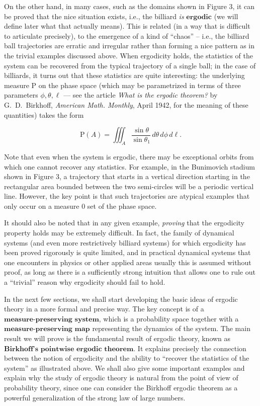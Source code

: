 \documentclass[11pt]{report}
\theoremstyle{plain}
\theoremstyle{definition}
\begin{document}
On the other hand, in many cases, such as the domains shown in Figure 3, it can be proved that the nice situation exists, i.e., the billiard \emph{is} $\textbf{ergodic}$ (we will define later what that actually means). This is related (in a way that is difficult to articulate precisely), to the emergence of a kind of ``chaos'' -- i.e., the billiard ball trajectories are erratic and irregular rather than forming a nice pattern as in the trivial examples discussed above. When ergodicity holds, the statistics of the system can be recovered from the typical trajectory of a single ball; in the case of billiards, it turns out that these statistics are quite interesting: the underlying measure $\mathrm{P}$ on the phase space (which may be parametrized in terms of three parameters $\phi, \theta, \ell$ --- see the article \emph{What is the ergodic theorem?} by G.~D.~Birkhoff, \emph{American Math. Monthly}, April 1942, for the meaning of these quantities) takes the form

\[
\mathrm{P}(A) = \iiint_A \frac{\sin \theta}{\sin\theta_1} \,d\theta\,d\phi\,d\ell.
\]

Note that even when the system is ergodic, there may be exceptional orbits from which one cannot recover any statistics. For example, in the Bunimovich stadium shown in Figure 3, a trajectory that starts in a vertical direction starting in the rectangular area bounded between the two semi-circles will be a periodic vertical line. However, the key point is that such trajectories are atypical examples that only occur on a measure 0 set of the phase space.

It should also be noted that in any given example, \emph{proving} that the ergodicity property holds may be extremely difficult. In fact, the family of dynamical systems (and even more restrictively billiard systems) for which ergodicity has been proved rigorously is quite limited, and in practical dynamical systems that one encounters in physics or other applied areas usually this is assumed without proof, as long as there is a sufficiently strong intuition that allows one to rule out a ``trivial'' reason why ergodicity should fail to hold.

In the next few sections, we shall start developing the basic ideas of ergodic theory in a more formal and precise way. The key concept is of a $\textbf{measure-preserving system}$, which is a probability space together with a $\textbf{measure-preserving map}$ representing the dynamics of the system. The main result we will prove is the fundamental result of ergodic theory, known as $\textbf{Birkhoff's pointwise ergodic theorem}$. It explains precisely the connection between the notion of ergodicity and the ability to ``recover the statistics of the system'' as illustrated above. We shall also give some important examples and explain why the study of ergodic theory is natural from the point of view of probability theory, since one can consider the Birkhoff ergodic theorem as a powerful generalization of the strong law of large numbers.
\end{document}
